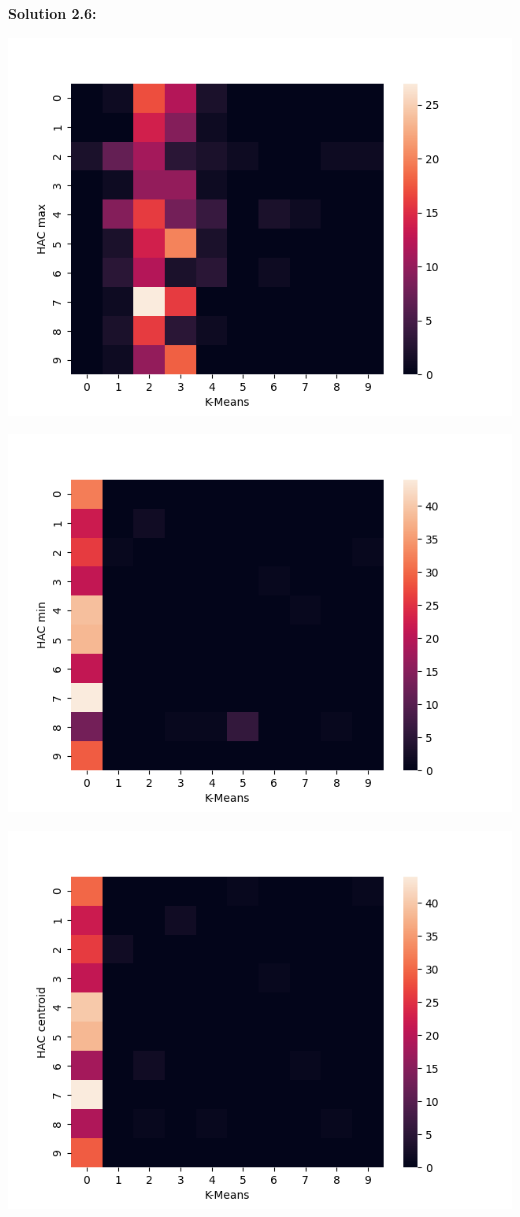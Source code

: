 \documentclass[submit]{harvardml}
\begin{document}
\noindent\textbf{Solution 2.6:}\\
\begin{center}
    \includegraphics[scale=0.5]{HW4/2.6.1.png}
\end{center}
\begin{center}
    \includegraphics[scale=0.5]{HW4/2.6.2.png}
\end{center}
\begin{center}
    \includegraphics[scale=0.5]{HW4/2.6.3.png}
\end{center}
\end{document}
